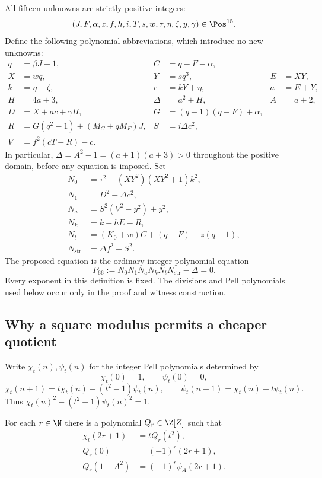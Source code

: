 All fifteen unknowns are strictly positive integers:
\[
 (J,F,\alpha,z,f,h,i,T,s,w,\tau,\eta,\zeta,y,\gamma)\in\Pos^{15}.
\]
Define the following polynomial abbreviations, which introduce no new
unknowns:
\begin{align*}
 q&=\beta J+1,                 & C&=q-F-\alpha,\\
 X&=wq,                       & Y&=sq^3, & E&=XY,\\
 k&=\eta+\zeta,               & c&=kY+\eta, & a&=E+Y,\\
 H&=4a+3,                     & \Delta&=a^2+H, & A&=a+2,\\
 D&=X+ac+\gamma H,            & G&=(q-1)(q-F)+\alpha,\\
 R&=G(q^2-1)+(M_C+qM_F)J,     & S&=i\Delta c^2,\\
 V&=f^2(cT-R)-c.&&&
\end{align*}
In particular, \(\Delta=A^2-1=(a+1)(a+3)>0\) throughout the positive
domain, before any equation is imposed.  Set
\begin{align*}
 N_0&=\tau^2-(XY^2)(XY^2+1)k^2,\\
 N_1&=D^2-\Delta c^2,\\
 N_a&=S^2(V^2-y^2)+y^2,\\
 N_k&=k-hE-R,\\
 N_t&=(K_0+w)C+(q-F)-z(q-1),\\
 N_{\mathrm{str}}&=\Delta f^2-S^2.
\end{align*}
The proposed equation is the ordinary integer polynomial equation
\begin{equation}
 \boxed{\quad
 P_{66}:=N_0N_1N_aN_kN_tN_{\mathrm{str}}-\Delta=0.
 \quad}
 \label{eq:p66}
\end{equation}
Every exponent in this definition is fixed.  The divisions and Pell
polynomials used below occur only in the proof and witness construction.

\subsection{Why a square modulus permits a cheaper quotient}

Write \(\chi_t(n),\psi_t(n)\) for the integer Pell polynomials determined by
\[
 \chi_t(0)=1,\qquad \psi_t(0)=0,
\]
\[
 \chi_t(n+1)=t\chi_t(n)+(t^2-1)\psi_t(n),\qquad
 \psi_t(n+1)=\chi_t(n)+t\psi_t(n).
\]
Thus \(\chi_t(n)^2-(t^2-1)\psi_t(n)^2=1\).

\begin{lemma}
\label{lem:odd-quotient}
For each \(r\in\N\) there is a polynomial \(Q_r\in\Z[Z]\) such that
\begin{align}
 \chi_t(2r+1)&=tQ_r(t^2),\label{eq:odd-quotient-identity}\\
 Q_r(0)&=(-1)^r(2r+1),\label{eq:odd-quotient-constant}\\
 Q_r(1-A^2)&=(-1)^r\psi_A(2r+1).
 \label{eq:odd-quotient-conjugate}
\end{align}
\end{lemma}

